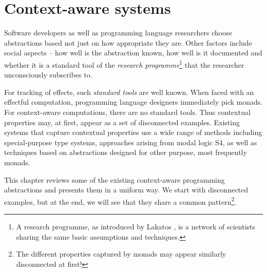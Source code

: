 \chapter{Context-aware systems}
\label{ch:applications}

Software developers as well as programming language researchers choose abstractions based not
just on how appropriate they are. Other factors include social aspects -- how well is the
abstraction known, how well is it documented and whether it is a standard tool of the
\emph{research programme}\footnote{A research programme, as introduced by Lakatos \cite{philosophy-lakatos},
is a network of scientists sharing the same basic assumptions and techniques.} that the researcher
unconsciously subscribes to.

For tracking of effects, such \emph{standard tools} are well known. When faced with an effectful
computation, programming language designers immediately pick monads. For context-aware computations,
there are no standard tools. Thus contextual properties may, at first, appear as a set of disconnected
examples. Existing systems that capture contextual properties use a wide range of methods including
special-purpose type systems, approaches arising from modal logic S4, as well as techniques based
on abstractions designed for other purpose, most frequently monads.

This chapter reviews some of the existing context-aware programming abstractions and presents them
in a uniform way. We start with disconnected examples, but at the end, we will see that they
share a common pattern\footnote{The different properties captured by monads may appear similarly
disconnected at first!}.

